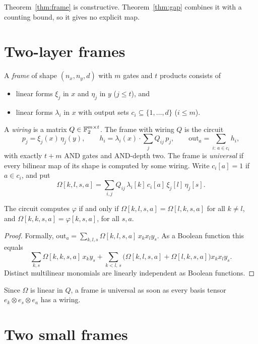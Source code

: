 Theorem~\ref{thm:frame} is constructive. Theorem~\ref{thm:gap} combines it with a counting bound, so it gives no explicit map.

\section{Two-layer frames}

A \emph{frame} of shape $(n_x,n_y,d)$ with $m$ gates and $t$ products consists of
\begin{itemize}
\item linear forms $\xi_j$ in $x$ and $\eta_j$ in $y$ ($j\le t$), and
\item linear forms $\lambda_i$ in $x$ with output sets $c_i\subseteq\{1,\dots,d\}$ ($i\le m$).
\end{itemize}
A \emph{wiring} is a matrix $Q\in\mathbb F_2^{m\times t}$. The frame with wiring $Q$ is the circuit
\[
p_j=\xi_j(x)\,\eta_j(y),\qquad h_i=\lambda_i(x)\cdot\sum_jQ_{ij}\,p_j,\qquad \mathrm{out}_a=\sum_{i:\,a\in c_i}h_i,
\]
with exactly $t+m$ AND gates and AND-depth two. The frame is \emph{universal} if every bilinear map of its shape is computed by some wiring. Write $c_i[a]=1$ if $a\in c_i$, and put
\[
\Omega[k,l,s,a]=\sum_{i,j}Q_{ij}\,\lambda_i[k]\,c_i[a]\,\xi_j[l]\,\eta_j[s].
\]

\begin{lemma}\label{lem:crit}
The circuit computes $\varphi$ if and only if $\Omega[k,l,s,a]=\Omega[l,k,s,a]$ for all $k\neq l$, and $\Omega[k,k,s,a]=\varphi[k,s,a]$, for all $s,a$.
\end{lemma}
\begin{proof}
Formally, $\mathrm{out}_a=\sum_{k,l,s}\Omega[k,l,s,a]\,x_kx_ly_s$. As a Boolean function this equals
\[
\sum_{k,s}\Omega[k,k,s,a]\,x_ky_s+\sum_{k<l,\,s}\bigl(\Omega[k,l,s,a]+\Omega[l,k,s,a]\bigr)x_kx_ly_s .
\]
Distinct multilinear monomials are linearly independent as Boolean functions.
\end{proof}

Since $\Omega$ is linear in $Q$, a frame is universal as soon as every basis tensor $e_k\otimes e_s\otimes e_a$ has a wiring.

\section{Two small frames}

